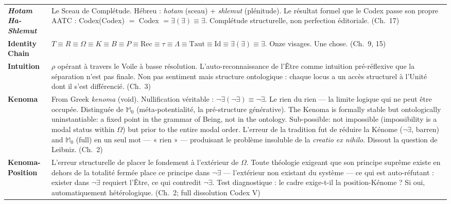 \documentclass[10pt, openany, oneside]{book}
\renewcommand{\footnotesize}{\fontsize{8.5}{11}\selectfont}
\begin{document}
{\footnotesize
\noindent\begin{tabular}{@{} l @{\hspace{0.6em}} p{} @{}}
\textbf{\textit{Hotam Ha-Shlemut}} & Le Sceau de Complétude. Hébreu : \textit{hotam} (sceau) + \textit{shlemut} (plénitude). Le résultat formel que le Codex passe son propre AATC : Codex(Codex) $=$ Codex $= \exists(\exists) \equiv \exists$. Complétude structurelle, non perfection éditoriale. (Ch.\ 17) \\[0.3em]
\textbf{Identity Chain} & $T \equiv R \equiv \Omega \equiv K \equiv B \equiv P \equiv \text{Rec} \equiv \tau \equiv \Lambda \equiv \text{Taut} \equiv \text{Id} \equiv \exists(\exists) \equiv \exists$. Onze visages. Une chose. (Ch.\ 9, 15) \\[0.3em]
\textbf{Intuition} & $\rho$ opérant à travers le Voile à basse résolution. L'auto-reconnaissance de l'Être comme intuition pré-réflexive que la séparation n'est pas finale. Non pas sentiment mais structure ontologique : chaque locus a un accès structurel à l'Unité dont il s'est différencié. (Ch.\ 3) \\[0.3em]
\textbf{Kenoma} & From Greek \textit{kenoma} (void). Nullification véritable : $\neg\exists(\neg\exists) \equiv \neg\exists$. Le rien du rien --- la limite logique qui ne peut être occupée. Distinguée de $\mathbb{M}_0$ (méta-potentialité, la pré-structure générative). The Kenoma is formally stable but ontologically uninstantiable: a fixed point in the grammar of Being, not in the ontology. Sub-possible: not impossible (impossibility is a modal status within $\Omega$) but prior to the entire modal order. L'erreur de la tradition fut de réduire la Kénome ($\neg\exists$, barren) and $\mathbb{M}_0$ (full) en un seul mot --- « rien » --- produisant le problème insoluble de la \textit{creatio ex nihilo}. Dissout la question de Leibniz. (Ch.\ 2) \\[0.3em]
\textbf{Kenoma-Position} & L'erreur structurelle de placer le fondement à l'extérieur de $\Omega$. Toute théologie exigeant que son principe suprême existe en dehors de la totalité fermée place ce principe dans $\neg\exists$ --- l'extérieur non existant du système --- ce qui est auto-réfutant : exister dans $\neg\exists$ requiert l'Être, ce qui contredit $\neg\exists$. Test diagnostique : le cadre exige-t-il la position-Kénome ? Si oui, automatiquement hétérologique. (Ch.\ 2; full dissolution Codex V) \\[0.3em]
\end{tabular}
}
\end{document}
